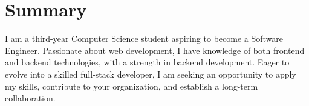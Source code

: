 \section{Summary}
    \begin{itemize}[leftmargin=0.15in, label={}]
	\small{\item{
		I am a third-year Computer Science student aspiring to become a Software Engineer. Passionate about web development, I have knowledge of both frontend and backend technologies, with a strength in backend development. Eager to evolve into a skilled full-stack developer, I am seeking an opportunity to apply my skills, contribute to your organization, and establish a long-term collaboration.
}}
    \end{itemize}